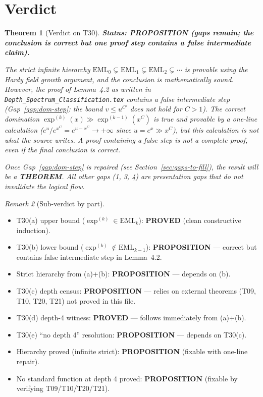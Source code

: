 \documentclass[12pt,a4paper]{article}
\newtheorem{theorem}{Theorem}[section]
\theoremstyle{definition}
\theoremstyle{remark}
\newtheorem{remark}[theorem]{Remark}
\begin{document}
\section{Verdict}

\begin{theorem}[Verdict on T30]\label{thm:verdict}
\textbf{Status: \textcolor{gapred}{PROPOSITION} (gaps remain; the conclusion
is correct but one proof step contains a false intermediate claim).}

The strict infinite hierarchy
$\mathrm{EML}_0\subsetneq\mathrm{EML}_1\subsetneq\mathrm{EML}_2
\subsetneq\cdots$ \emph{is} provable using the Hardy field growth argument,
and the conclusion is mathematically sound.  However, the proof of Lemma~4.2
as written in \texttt{Depth\_Spectrum\_Classification.tex} contains a false
intermediate step (Gap~\ref{gap:dom-step}: the bound $v\leq u^{C'}$ does not
hold for $C>1$).  The correct domination $\exp^{(k)}(x)\gg\exp^{(k-1)}(x^C)$
is true and provable by a one-line calculation ($e^u/e^{x^C}=e^{u-x^C}\to+\infty$
since $u=e^x\gg x^C$), but this calculation is not what the source writes.
A proof containing a false step is not a complete proof, even if the final
conclusion is correct.

Once Gap~\ref{gap:dom-step} is repaired (see Section~\ref{sec:gaps-to-fill}),
the result will be a \textbf{THEOREM}.  All other gaps (1, 3, 4) are
presentation gaps that do not invalidate the logical flow.
\end{theorem}

\begin{remark}[Sub-verdict by part]
\mbox{}
\begin{itemize}
  \item T30(a) upper bound ($\exp^{(k)}\in\mathrm{EML}_k$):
        \textcolor{verdictgreen}{\textbf{PROVED}} (clean constructive induction).
  \item T30(b) lower bound ($\exp^{(k)}\notin\mathrm{EML}_{k-1}$):
        \textcolor{gapred}{\textbf{PROPOSITION}} --- correct but contains false
        intermediate step in Lemma~4.2.
  \item Strict hierarchy from (a)+(b):
        \textcolor{gapred}{\textbf{PROPOSITION}} --- depends on (b).
  \item T30(c) depth census:
        \textcolor{gapred}{\textbf{PROPOSITION}} --- relies on external theorems
        (T09, T10, T20, T21) not proved in this file.
  \item T30(d) depth-4 witness:
        \textcolor{verdictgreen}{\textbf{PROVED}} --- follows immediately from (a)+(b).
  \item T30(e) ``no depth 4'' resolution:
        \textcolor{gapred}{\textbf{PROPOSITION}} --- depends on T30(c).
  \item Hierarchy proved (infinite strict):
        \textcolor{gapred}{\textbf{PROPOSITION}} (fixable with one-line repair).
  \item No standard function at depth 4 proved:
        \textcolor{gapred}{\textbf{PROPOSITION}} (fixable by verifying T09/T10/T20/T21).
\end{itemize}
\end{remark}
\end{document}
